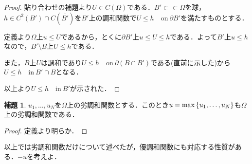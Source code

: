 \documentclass[a4paper]{ltjsarticle}
\newcommand{\Om}{\Omega}
\newcommand{\ssubset}{\subset\subset}
\newcommand{\inn}{\quad\text{in}\ }
\newcommand{\on}{\quad \text{on}\ }
\newcommand{\1}{\mathbbm{1}}
\numberwithin{equation}{section}
\theoremstyle{definition}
\newtheorem{lem}[thm]{補題}
\begin{document}
\begin{proof}
    貼り合わせの補題より$U\in C(\Om)$である．$B'\ssubset \Om$を球，$h\in C^2(B')\cap C(\overline{B'})$を$B'$上の調和関数で$U\leq h\on \partial B'$を満たすものとする．

    定義より$\Om$上$u\leq U$であるから，とくに$\partial B'$上$u\leq U\leq h$である．よって$B'$上$u\leq h$なので，$B'\setminus B$上$U\leq h$である．

    また，$B$上$U$は調和であり$U\leq h\on \partial(B\cap B')$である(直前に示した)から$U\leq h\inn B'\cap B$となる．

    以上より$U\leq h\inn B'$が示された．
\end{proof}
\begin{lem}\label{lem:perron_4}
    $u_1,\ldots,u_N$を$\Om$上の劣調和関数とする．このとき$u=\max\qty{u_1,\ldots,u_N}$も$\Om$上の劣調和関数である．
\end{lem}
\begin{proof}
    定義より明らか．
\end{proof}
以上では劣調和関数だけについて述べたが，優調和関数にも対応する性質がある．$-u$を考えよ．
\end{document}
